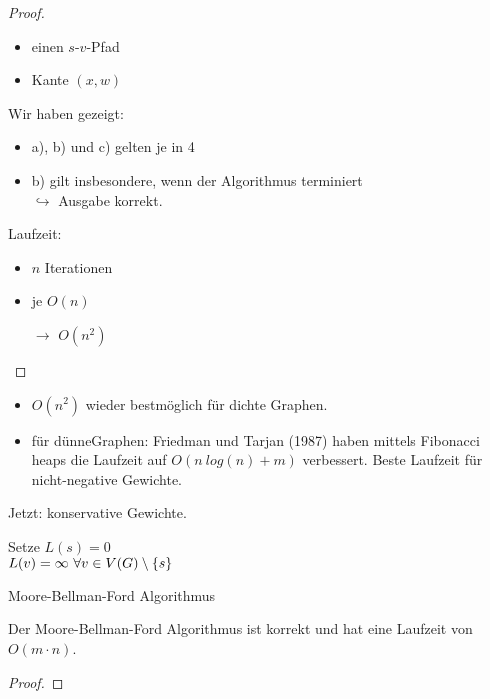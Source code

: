 \begin{proof}
	\begin{itemize}
		\item einen $s$-$v$-Pfad
		\item Kante $(x,w)$
	\end{itemize}
	Wir haben gezeigt:
	\begin{itemize}
		\item a), b) und c) gelten je in 4
		\item b) gilt insbesondere, wenn der Algorithmus terminiert\\
		$\hookrightarrow$ Ausgabe korrekt.
	\end{itemize}
	Laufzeit:
	\begin{itemize}
		\item $n$ Iterationen
		\item je $O(n)$
		\item[$\to$] $O(n^2)$
	\end{itemize}
\end{proof}
\begin{rem}
	\begin{itemize}
		\item $O(n^2)$ wieder bestmöglich für dichte Graphen.
		\item für \dq dünne\dq Graphen: Friedman und Tarjan (1987) haben mittels Fibonacci heaps die Laufzeit auf $O(n~log(n) + m)$ verbessert. Beste Laufzeit für nicht-negative Gewichte.
	\end{itemize}
\end{rem}
Jetzt: konservative Gewichte.
\begin{algorithm}
	\vspace*{5pt}
	Setze $L(s) = 0$\\
	\hspace*{25pt}$L(v) = \infty~\forall v \in V(G)\setminus \{s\}$\\
	\caption{Moore-Bellman-Ford Algorithmus}
	\label{fig:Algorithmus}
\end{algorithm}
\begin{satz}
	Der Moore-Bellman-Ford Algorithmus ist korrekt und hat eine Laufzeit von $O(m\cdot n)$.
\end{satz}
\begin{proof}
	
\end{proof}
